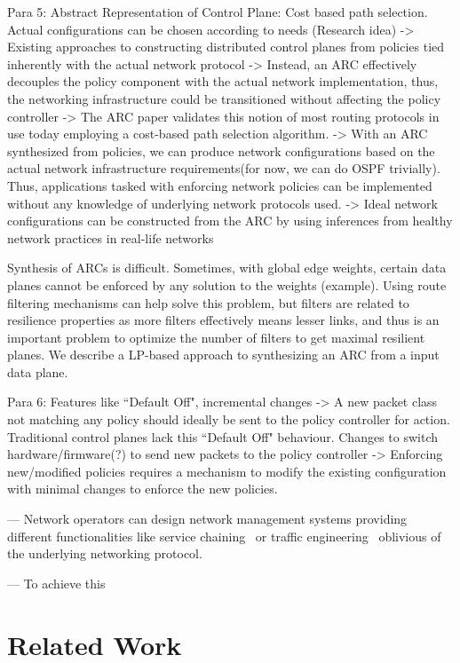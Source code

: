 \documentclass{hotnets16}
\begin{document}
Para 5: Abstract Representation of Control Plane: Cost based path selection. 
Actual configurations can be chosen according to needs (Research idea)
->  Existing approaches to constructing distributed control planes 
	from policies tied inherently with the actual network protocol
->  Instead, an ARC effectively decouples the policy component with the 
	actual network implementation, thus, the networking infrastructure could be
	transitioned without affecting the policy controller
->  The ARC paper validates this notion of most routing protocols in use 
	today employing a cost-based path selection algorithm. 
->  With an ARC synthesized from policies, we 
	can produce network configurations based on the
	actual network infrastructure requirements(for now, we can do OSPF trivially). 
	Thus, applications tasked with enforcing network policies can be 
	implemented without any knowledge of underlying network protocols used.
->  Ideal network configurations can be constructed from the ARC by using 
	inferences from healthy network practices in real-life networks~\cite{mpa-imc15}

Synthesis of ARCs is difficult. Sometimes, with global edge weights, 
	certain data planes cannot be enforced by any solution to the weights
	(example). Using route filtering mechanisms can help solve this problem, but 
	filters are related to resilience properties as more filters effectively 
	means lesser links, and thus is an important
	problem to optimize the number of filters to get maximal resilient planes. We describe
	a LP-based approach to synthesizing an ARC from a input data plane. 

Para 6: Features like ``Default Off", incremental changes 
->  A new packet class not matching any policy should ideally be sent to the 
	policy controller for action. Traditional control planes lack this
	``Default Off" behaviour. Changes to switch hardware/firmware(?) to 
	send new packets to the policy controller
->  Enforcing new/modified policies requires a mechanism to modify the 
	existing configuration with minimal changes to enforce the new policies.

--- Network operators can design network management systems
providing different functionalities like service chaining~\cite{simple} or traffic
engineering~\cite{} oblivious of the underlying networking protocol.

--- To achieve this

\section{Related Work}
\end{document}
